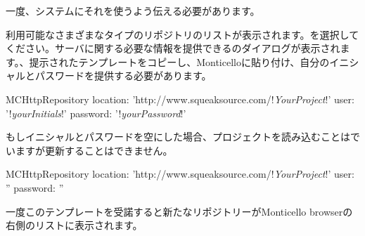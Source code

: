 \documentclass[a4paper,10pt,twoside]{book}
\begin{document}
一度、\pharo{}システムにそれを使うよう伝える必要があります。

  利用可能なさまざまなタイプのリポジトリのリストが表示されます。を選択してください。サーバに関する必要な情報を提供できるのダイアログが表示されます。、提示されたテンプレートをコピーし、Monticelloに貼り付け、自分のイニシャルとパスワードを提供する必要があります。 

\begin{code}{}
MCHttpRepository 
    location: 'http://www.squeaksource.com/!\emph{YourProject}!'
    user: '!\emph{yourInitials}!' 
    password: '!\emph{yourPassword}!'
\end{code}   

\noindent
もしイニシャルとパスワードを空にした場合、プロジェクトを読み込むことはでいますが更新することはできません。

\begin{code}{}
MCHttpRepository 
    location: 'http://www.squeaksource.com/!\emph{YourProject}!'
    user: '' 
    password: ''
\end{code}   

一度このテンプレートを受諾すると新たなリポジトリーがMonticello browserの右側のリストに表示されます。
\end{document}
